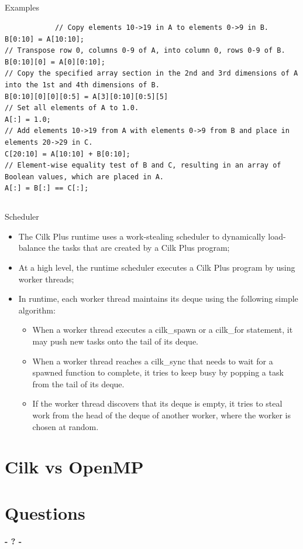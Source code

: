 \documentclass{beamer}
\begin{document}
\subsection{}
\begin{frame}[fragile]
	\begin{block}{Examples}
		\begin{lstlisting}
			// Copy elements 10->19 in A to elements 0->9 in B.
B[0:10] = A[10:10];
// Transpose row 0, columns 0-9 of A, into column 0, rows 0-9 of B.
B[0:10][0] = A[0][0:10];
// Copy the specified array section in the 2nd and 3rd dimensions of A into the 1st and 4th dimensions of B.
B[0:10][0][0][0:5] = A[3][0:10][0:5][5]
// Set all elements of A to 1.0.
A[:] = 1.0;
// Add elements 10->19 from A with elements 0->9 from B and place in elements 20->29 in C.
C[20:10] = A[10:10] + B[0:10];
// Element-wise equality test of B and C, resulting in an array of Boolean values, which are placed in A.
A[:] = B[:] == C[:];
		\end{lstlisting}
	\end{block}
\end{frame}

\subsection{}
\begin{frame}[fragile]
	\begin{block}{Scheduler}
		\begin{itemize}
			\item The Cilk Plus runtime uses a work-stealing scheduler to dynamically load-balance the tasks that are created by a Cilk Plus program;
			\item At a high level, the runtime scheduler executes a Cilk Plus program by using worker threads;
			\item In runtime, each worker thread maintains its deque using the following simple algorithm:
			\begin{itemize}
				\item When a worker thread executes a cilk\_spawn or a cilk\_for statement, it may push new tasks onto the tail of its deque.
				\item When a worker thread reaches a cilk\_sync that needs to wait for a spawned function to complete, it tries to keep busy by popping a task from the tail of its deque.
				\item If the worker thread discovers that its deque is empty, it tries to steal work from the head of the deque of another worker, where the worker is chosen at random.
			\end{itemize}
		\end{itemize}
	\end{block}
\end{frame}

\section{Cilk vs OpenMP}



\section{Questions}
\begin{frame}
\titlepage
	\begin{center}
		\Huge\bfseries
		- ? -
	\end{center}
\end{frame}
\end{document}
